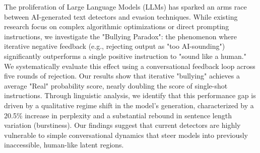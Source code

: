 The proliferation of Large Language Models (LLMs) has sparked an arms race between AI-generated text detectors and evasion techniques. While existing research focus on complex algorithmic optimizations or direct prompting instructions, we investigate the "Bullying Paradox": the phenomenon where iterative negative feedback (e.g., rejecting output as "too AI-sounding") significantly outperforms a single positive instruction to "sound like a human." We systematically evaluate this effect using a conversational feedback loop across five rounds of rejection. Our results show that iterative "bullying" achieves a \roundfiveacc average "Real" probability score, nearly doubling the \singleshotacc score of single-shot instructions. Through linguistic analysis, we identify that this performance gap is driven by a qualitative regime shift in the model's generation, characterized by a 20.5\% increase in perplexity and a substantial rebound in sentence length variation (burstiness). Our findings suggest that current detectors are highly vulnerable to simple conversational dynamics that steer models into previously inaccessible, human-like latent regions.
